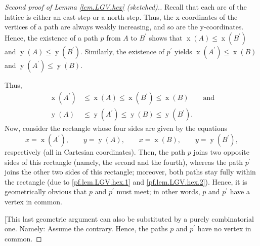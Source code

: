 \documentclass[reqno]{amsart}%
\newcommand{\0}{\phantom{c}}
\theoremstyle{plain}
\theoremstyle{definition}
\numberwithin{equation}{section}
\begin{document}
\begin{proof}
[Second proof of Lemma \ref{lem.LGV.hex} (sketched).]Recall that each arc of
the lattice is either an east-step or a north-step. Thus, the x-coordinates of
the vertices of a path are always weakly increasing, and so are the
y-coordinates. Hence, the existence of a path $p$ from $A$ to $B^{\prime}$
shows that $\operatorname*{x}\left(  A\right)  \leq\operatorname*{x}\left(
B^{\prime}\right)  $ and $\operatorname*{y}\left(  A\right)  \leq
\operatorname*{y}\left(  B^{\prime}\right)  $. Similarly, the existence of
$p^{\prime}$ yields $\operatorname*{x}\left(  A^{\prime}\right)
\leq\operatorname*{x}\left(  B\right)  $ and $\operatorname*{y}\left(
A^{\prime}\right)  \leq\operatorname*{y}\left(  B\right)  $.

Thus,%
\begin{align}
\operatorname*{x}\left(  A^{\prime}\right)   &  \leq\operatorname*{x}\left(
A\right)  \leq\operatorname*{x}\left(  B^{\prime}\right)  \leq
\operatorname*{x}\left(  B\right)  \qquad\text{and}\label{pf.lem.LGV.hex.1}\\
\operatorname*{y}\left(  A\right)   &  \leq\operatorname*{y}\left(  A^{\prime
}\right)  \leq\operatorname*{y}\left(  B\right)  \leq\operatorname*{y}\left(
B^{\prime}\right)  . \label{pf.lem.LGV.hex.2}%
\end{align}
Now, consider the rectangle whose four sides are given by the equations%
\[
x=\operatorname*{x}\left(  A^{\prime}\right)  ,\qquad y=\operatorname*{y}%
\left(  A\right)  ,\qquad x=\operatorname*{x}\left(  B\right)  ,\qquad
y=\operatorname*{y}\left(  B^{\prime}\right)  ,
\]
respectively (all in Cartesian coordinates). Then, the path $p$ joins two
opposite sides of this rectangle (namely, the second and the fourth), whereas
the path $p^{\prime}$ joins the other two sides of this rectangle; moreover,
both paths stay fully within the rectangle (due to \eqref{pf.lem.LGV.hex.1}
and \eqref{pf.lem.LGV.hex.2}). Hence, it is geometrically obvious that $p$ and
$p^{\prime}$ must meet; in other words, $p$ and $p^{\prime}$ have a vertex in common.

[This last geometric argument can also be substituted by a purely
combinatorial one. Namely: Assume the contrary. Hence, the paths $p$ and
$p^{\prime}$ have no vertex in common.


\end{proof}
\end{document}

